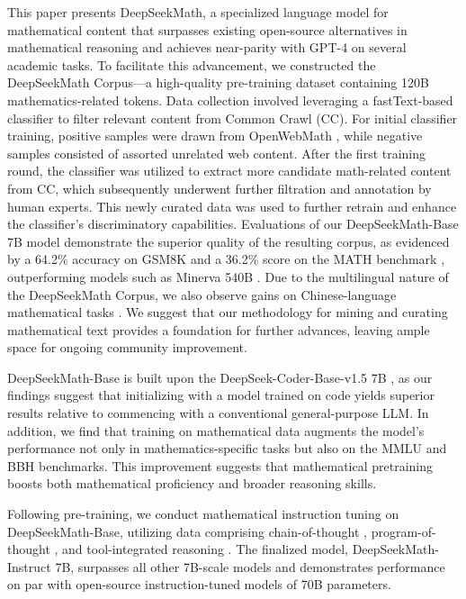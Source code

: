 This paper presents DeepSeekMath, a specialized language model for mathematical content that surpasses existing open-source alternatives in mathematical reasoning and achieves near-parity with GPT-4 on several academic tasks. To facilitate this advancement, we constructed the DeepSeekMath Corpus—a high-quality pre-training dataset containing 120B mathematics-related tokens. Data collection involved leveraging a fastText-based classifier \citep{joulin2016fasttext} to filter relevant content from Common Crawl (CC). For initial classifier training, positive samples were drawn from OpenWebMath \citep{openwebmath}, while negative samples consisted of assorted unrelated web content. After the first training round, the classifier was utilized to extract more candidate math-related content from CC, which subsequently underwent further filtration and annotation by human experts. This newly curated data was used to further retrain and enhance the classifier’s discriminatory capabilities. Evaluations of our DeepSeekMath-Base 7B model demonstrate the superior quality of the resulting corpus, as evidenced by a 64.2\% accuracy on GSM8K \citep{gsm8k} and a 36.2\% score on the MATH benchmark \citep{MATH}, outperforming models such as Minerva 540B \citep{minerva}. Due to the multilingual nature of the DeepSeekMath Corpus, we also observe gains on Chinese-language mathematical tasks \citep{wei2023cmath,agieval}. We suggest that our methodology for mining and curating mathematical text provides a foundation for further advances, leaving ample space for ongoing community improvement.

DeepSeekMath-Base is built upon the DeepSeek-Coder-Base-v1.5 7B \citep{deepseek-coder}, as our findings suggest that initializing with a model trained on code yields superior results relative to commencing with a conventional general-purpose LLM. In addition, we find that training on mathematical data augments the model’s performance not only in mathematics-specific tasks but also on the MMLU \citep{mmlu} and BBH \citep{bbh} benchmarks. This improvement suggests that mathematical pretraining boosts both mathematical proficiency and broader reasoning skills.

Following pre-training, we conduct mathematical instruction tuning on DeepSeekMath-Base, utilizing data comprising chain-of-thought \citep{cot}, program-of-thought \citep{pot,pal}, and tool-integrated reasoning \citep{tora}. The finalized model, DeepSeekMath-Instruct 7B, surpasses all other 7B-scale models and demonstrates performance on par with open-source instruction-tuned models of 70B parameters.

